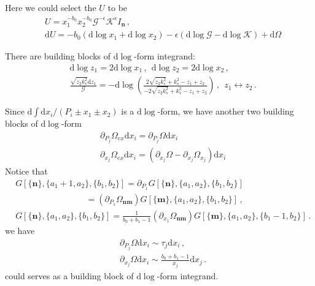 \documentclass[a4paper,12pt]{article}
\newcommand{\n}{\nonumber}
\def\di{{\mathrm{d}}}
\def\ep{\epsilon}
\newcommand{\mG}{\mathcal{G}}
\newcommand{\mK}{\mathcal{K}}
\begin{document}
Here we could select the $U$ to be
\begin{align}
& U = x_1^{-b_0} x_2^{-b_0} \mG^{-\ep} \mK^\ep I_{\bm{n}}  \,, \n \\
&\di U = -b_0(\di \log x_1 + \di \log x_2)  -\ep (\di \log \mG - \di \log \mK) + \di \Omega
\end{align}


There are building blocks of $\di \log$-form integrand:
\begin{align}
&\di\log z_1=2\di\log x_1 \,, ~~ \di \log z_2=2\di\log x_2 \,, \n\\ 
&\frac{\sqrt{z_2 k_s^2} \di z_1}{ \mG} = - \di \log \left(\frac{2 \sqrt{z_2 k_s^2}+k_s^2-z_1+z_2}{-2 \sqrt{z_2 k_s^2}+k_s^2-z_1+z_2}\right)   \,, ~~ z_1\leftrightarrow z_2  \,.
\end{align}





Since $\di \int \di x_i / (P_i \pm x_1 \pm x_2) $ is a  $\di \log$-form, we have another two building blocks of $\di \log$-form
\begin{align}
&\partial_{P_j} \Omega_{ex} \di x_i =\partial_{P_j} \Omega \di x_i \n\\
&\partial_{x_j} \Omega_{ex} \di x_i =(\partial_{x_j} \Omega- \partial_{x_j} \Omega_{x_j}) \di x_i
\end{align} 
Notice that
\begin{align}
&G[\{\bm{n}\},\{a_1+1,a_2\},\{b_1,b_2\}]=\partial_{P_1}G[\{\bm{n}\},\{a_1,a_2\},\{b_1,b_2\}]\n\\
&~~~~~~~~~~~~~~~~~~~~~~~~~~~~~~~~~~~~~
=\left( \partial_{P_1}\Omega_{ \bm{n}\bm{m}} \right)   G[\{\bm{m}\},\{a_1,a_2\},\{b_1,b_2\}]  \, ,\n\\
&G[\{\bm{n}\},\{a_1,a_2\},\{b_1,b_2\}]=\frac{1}{b_0+b_1-1} \left( \partial_{x_1}\Omega_{ \bm{n}\bm{m} } \right) G[\{\bm{m} \},\{a_1,a_2\},\{b_1-1,b_2\}]  \, .
\end{align}
we have
\begin{align}
&\partial_{P_j} \Omega \di x_i \sim \tau_j \di x_i \, , \n\\
& \partial_{x_j} \Omega \di x_i \sim \frac{b_0 + b_1 - 1}{ x_j} \di x_j  \, .
\end{align} 
could serves as a building block of $\di \log$-form integrand.
\end{document}
